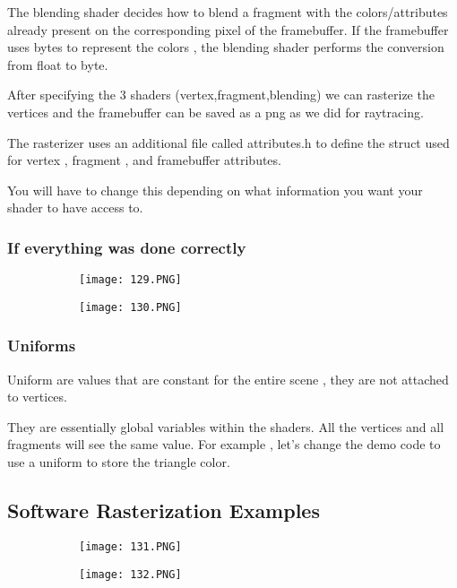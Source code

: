 \documentclass{article}
\begin{document}
The blending shader decides how to blend a fragment with the colors/attributes already present on the corresponding pixel of the framebuffer.
If the framebuffer uses bytes to represent the colors , the blending shader performs the conversion from float to byte.

After specifying the 3 shaders (vertex,fragment,blending) we can rasterize the vertices and the framebuffer can be saved as a png as we did for raytracing.

The rasterizer uses an additional file called attributes.h to define the struct used for vertex , fragment , and framebuffer attributes.

You will have to change this depending on what information you want your shader to have access to.

\subsubsection{If everything was done correctly}

\begin{figure}[ht!]
  \centering
  \begin{subfigure}[b]{0.39\linewidth}
    \texttt{[image: 129.PNG]}
  \end{subfigure}
  \begin{subfigure}[b]{0.5\textwidth}
         \centering
         \texttt{[image: 130.PNG]}
     \end{subfigure}
\end{figure}


\subsubsection{Uniforms}

Uniform are values that are constant for the entire scene , they are not attached to vertices.

They are essentially global variables within the shaders.
All the vertices and all fragments will see the same value.
For example , let's change the demo code to use a uniform to store the triangle color.


\subsection{Software Rasterization Examples}

\begin{figure}[ht!]
  \centering
  \begin{subfigure}[b]{0.19\linewidth}
    \texttt{[image: 131.PNG]}
  \end{subfigure}
  \begin{subfigure}[b]{0.5\textwidth}
         \centering
         \texttt{[image: 132.PNG]}
     \end{subfigure}
\end{figure}
\end{document}
